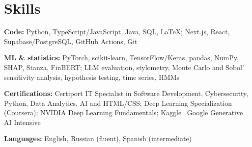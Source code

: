 \documentclass[letterpaper,11pt]{article}
\begin{document}
\section{Skills}
\textbf{Code:} Python, TypeScript/JavaScript, Java, SQL, LaTeX; Next.js, React, Supabase/PostgreSQL, GitHub Actions, Git\par
\textbf{ML \& statistics:} PyTorch, scikit-learn, TensorFlow/Keras, pandas, NumPy, SHAP, Stanza, FinBERT; LLM evaluation, stylometry, Monte Carlo and Sobol' sensitivity analysis, hypothesis testing, time series, HMMs\par
\textbf{Certifications:} Certiport IT Specialist in Software Development, Cybersecurity, Python, Data Analytics, AI and HTML/CSS; Deep Learning Specialization (Coursera); NVIDIA Deep Learning Fundamentals; Kaggle \texttimes\ Google Generative AI Intensive\par
\textbf{Languages:} English, Russian (fluent), Spanish (intermediate)\par
\end{document}
